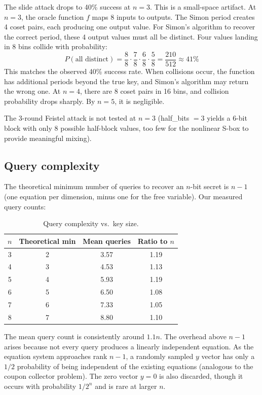 \documentclass[11pt]{article}
\begin{document}
The slide attack drops to 40\% success at $n=3$. This is a small-space artifact. At $n=3$, the oracle function $f$ maps 8 inputs to outputs. The Simon period creates 4 coset pairs, each producing one output value. For Simon's algorithm to recover the correct period, these 4 output values must all be distinct. Four values landing in 8 bins collide with probability:
\begin{equation}
    P(\text{all distinct}) = \frac{8}{8} \cdot \frac{7}{8} \cdot \frac{6}{8} \cdot \frac{5}{8} = \frac{210}{512} \approx 41\%
\end{equation}
This matches the observed 40\% success rate. When collisions occur, the function has additional periods beyond the true key, and Simon's algorithm may return the wrong one. At $n=4$, there are 8 coset pairs in 16 bins, and collision probability drops sharply. By $n=5$, it is negligible.

The 3-round Feistel attack is not tested at $n=3$ (half\_bits $= 3$ yields a 6-bit block with only 8 possible half-block values, too few for the nonlinear S-box to provide meaningful mixing).

\subsection{Query complexity}

The theoretical minimum number of queries to recover an $n$-bit secret is $n-1$ (one equation per dimension, minus one for the free variable). Our measured query counts:

\begin{table}[h]
\centering
\small
\begin{tabular}{@{}cccc@{}}
\toprule
$n$ & Theoretical min & Mean queries & Ratio to $n$ \\
\midrule
3 & 2 & 3.57 & 1.19 \\
4 & 3 & 4.53 & 1.13 \\
5 & 4 & 5.93 & 1.19 \\
6 & 5 & 6.50 & 1.08 \\
7 & 6 & 7.33 & 1.05 \\
8 & 7 & 8.80 & 1.10 \\
\bottomrule
\end{tabular}
\caption{Query complexity vs.\ key size.}
\end{table}

The mean query count is consistently around $1.1n$. The overhead above $n-1$ arises because not every query produces a linearly independent equation. As the equation system approaches rank $n-1$, a randomly sampled $y$ vector has only a $1/2$ probability of being independent of the existing equations (analogous to the coupon collector problem). The zero vector $y = 0$ is also discarded, though it occurs with probability $1/2^n$ and is rare at larger $n$.
\end{document}
